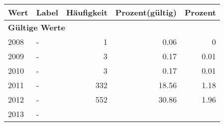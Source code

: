      \begin{longtable}{lXrrr}
     \toprule
     \textbf{Wert} & \textbf{Label} & \textbf{Häufigkeit} & \textbf{Prozent(gültig)} & \textbf{Prozent} \\
     \endhead
     \midrule
     \multicolumn{5}{l}{\textbf{Gültige Werte}}\\

     2008 &
     \multicolumn{1}{X}{ -  } &


       \num{1} &
       \num[round-mode=places,round-precision=2]{0.06} &
         \num[round-mode=places,round-precision=2]{0} \\

     2009 &
     \multicolumn{1}{X}{ -  } &


       \num{3} &
       \num[round-mode=places,round-precision=2]{0.17} &
         \num[round-mode=places,round-precision=2]{0.01} \\

     2010 &
     \multicolumn{1}{X}{ -  } &


       \num{3} &
       \num[round-mode=places,round-precision=2]{0.17} &
         \num[round-mode=places,round-precision=2]{0.01} \\

     2011 &
     \multicolumn{1}{X}{ -  } &


       \num{332} &
       \num[round-mode=places,round-precision=2]{18.56} &
         \num[round-mode=places,round-precision=2]{1.18} \\

     2012 &
     \multicolumn{1}{X}{ -  } &


       \num{552} &
       \num[round-mode=places,round-precision=2]{30.86} &
         \num[round-mode=places,round-precision=2]{1.96} \\

     2013 &
     \multicolumn{1}{X}{ -  } &



\end{longtable}
